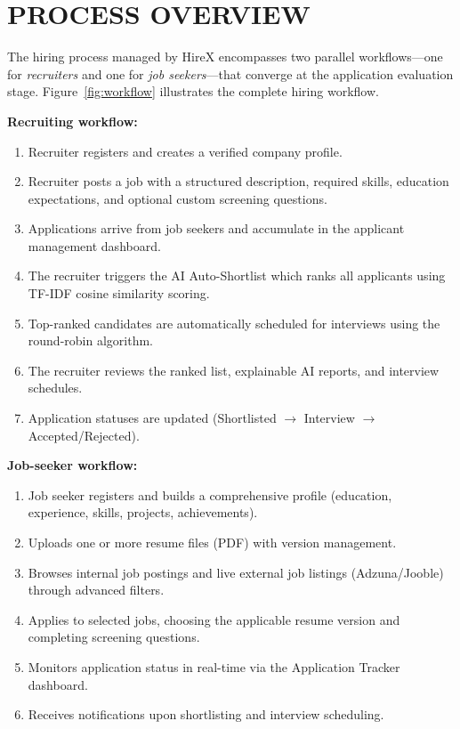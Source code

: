 \documentclass[12pt,a4paper]{report}
\begin{document}
\section{PROCESS OVERVIEW}

The hiring process managed by HireX encompasses two parallel workflows---one for \textit{recruiters} and one for \textit{job seekers}---that converge at the application evaluation stage. Figure~\ref{fig:workflow} illustrates the complete hiring workflow.

\textbf{Recruiting workflow:}
\begin{enumerate}[leftmargin=*, label=\arabic*., itemsep=2pt]
    \item Recruiter registers and creates a verified company profile.
    \item Recruiter posts a job with a structured description, required skills, education expectations, and optional custom screening questions.
    \item Applications arrive from job seekers and accumulate in the applicant management dashboard.
    \item The recruiter triggers the AI Auto-Shortlist which ranks all applicants using TF-IDF cosine similarity scoring.
    \item Top-ranked candidates are automatically scheduled for interviews using the round-robin algorithm.
    \item The recruiter reviews the ranked list, explainable AI reports, and interview schedules.
    \item Application statuses are updated (Shortlisted $\to$ Interview $\to$ Accepted/Rejected).
\end{enumerate}

\textbf{Job-seeker workflow:}
\begin{enumerate}[leftmargin=*, label=\arabic*., itemsep=2pt]
    \item Job seeker registers and builds a comprehensive profile (education, experience, skills, projects, achievements).
    \item Uploads one or more resume files (PDF) with version management.
    \item Browses internal job postings and live external job listings (Adzuna/Jooble) through advanced filters.
    \item Applies to selected jobs, choosing the applicable resume version and completing screening questions.
    \item Monitors application status in real-time via the Application Tracker dashboard.
    \item Receives notifications upon shortlisting and interview scheduling.
\end{enumerate}
\end{document}
